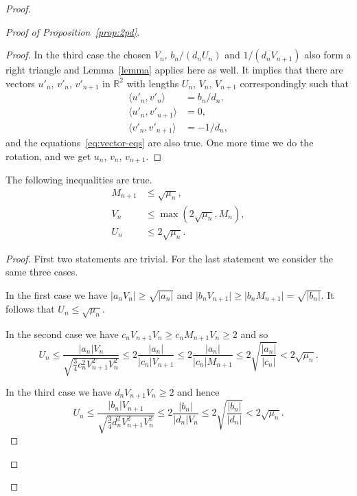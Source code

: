 \begin{proof}
\begin{proof}[Proof of Proposition~\ref{prop:2pd}]
\begin{proof}
          In the third case the chosen $V_n$, $b_n/(d_n U_n)$ and $1/(d_n V_{n+1})$ also form a right triangle and Lemma~\ref{lemma} applies here
            as well.
          It implies that there are vectors $u'_n$, $v'_n$, $v'_{n+1}$ in $\mathbb{R}^2$ with lengths $U_n$, $V_n$, $V_{n+1}$ correspondingly such that
          \begin{equation}
            \begin{aligned}
              \langle u'_n, v'_n \rangle &= b_n/d_n,\\
              \langle u'_n, v'_{n+1} \rangle &= 0,\\
              \langle v'_n, v'_{n+1} \rangle &= -1/d_n,
            \end{aligned}
          \end{equation}
          and the equations~\eqref{eq:vector-eqs} are also true.
          One more time we do the rotation, and we get $u_n$, $v_n$, $v_{n+1}$.
        \end{proof}
        \begin{prop}
          The following inequalities are true.
          \begin{align*}
            M_{n+1} &\leq \sqrt{\mu_n},\\
            V_n &\leq \max(2\sqrt{\mu_n}, M_n),\\
            U_n &\leq 2\sqrt{\mu_n}.
          \end{align*}
        \end{prop}
        \begin{proof}
          First two statements are trivial.
          For the last statement we consider the same three cases.

          In the first case we have $\lvert a_n V_n\rvert \geq \sqrt{\lvert a_n \rvert}$ and
            $\lvert b_n V_{n+1} \rvert \geq  \lvert b_n M_{n+1}\rvert = \sqrt{\lvert b_n \rvert}$.
          It follows that $U_n \leq \sqrt{\mu_n}$.

          In the second case we have $c_n V_{n+1} V_n \geq c_n M_{n+1} V_n \geq 2$ and so
          \[
            U_n \leq \dfrac{\lvert a_n\rvert V_n}{\sqrt{\frac{3}{4} c_n^2 V_{n+1}^2 V_n^2}} \leq 2\dfrac{\lvert a_n\rvert}{\lvert c_n\rvert V_{n+1}}
                \leq 2\dfrac{\lvert a_n\rvert}{\lvert c_n\rvert M_{n+1}} \leq 2\sqrt{\dfrac{\lvert a_n\rvert}{\lvert c_n\rvert}} < 2\sqrt{\mu_n}.
          \]

          In the third case we have $d_n V_{n+1} V_n \geq 2$ and hence
          \[
            U_n \leq \dfrac{\lvert b_n\rvert V_{n+1}}{\sqrt{\frac{3}{4} d_n^2 V_{n+1}^2 V_n^2}} \leq 2\dfrac{\lvert b_n\rvert}{\lvert d_n\rvert V_{n}}
                \leq 2\sqrt{\dfrac{\lvert b_n\rvert}{\lvert d_n\rvert}} < 2\sqrt{\mu_n}.
          \]
        \end{proof}


\end{proof}
\end{proof}

